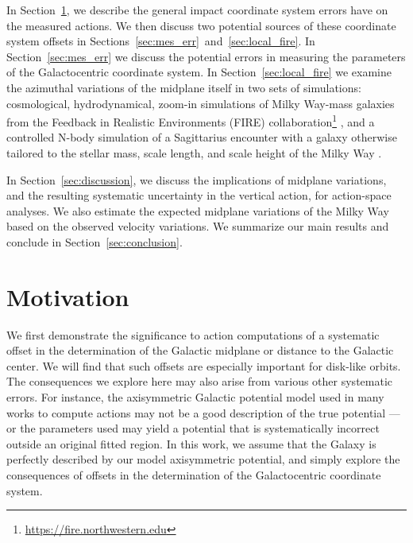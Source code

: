 \documentclass[twocolumn]{aastex62}
\begin{document}
In Section~\ref{sec:ref_frame}, we describe the general impact coordinate
system errors have on the measured actions. We then discuss two potential
sources of these coordinate system offsets in
Sections~\ref{sec:mes_err}~and~\ref{sec:local_fire}. In
Section~\ref{sec:mes_err} we discuss the potential errors in measuring the
parameters of the Galactocentric coordinate system. In
Section~\ref{sec:local_fire} we examine the azimuthal variations of the
midplane itself in two sets of simulations: cosmological, hydrodynamical,
zoom-in simulations of Milky Way-mass galaxies from the Feedback in Realistic
Environments (FIRE)
collaboration\footnote{\url{https://fire.northwestern.edu}}
\citep{2014MNRAS.445..581H, 2016ApJ...827L..23W, 2018MNRAS.480..800H}, and a
controlled N-body simulation of a Sagittarius encounter with a galaxy
otherwise tailored to the stellar mass, scale length, and scale height of the
Milky Way \citep{2018MNRAS.481..286L}.

In Section~\ref{sec:discussion}, we discuss the implications of midplane
variations, and the resulting systematic uncertainty in the vertical action,
for action-space analyses. We also estimate the expected midplane variations
of the Milky Way based on the observed velocity variations. We summarize our
main results and conclude in Section~\ref{sec:conclusion}.

\section{Motivation} \label{sec:ref_frame}
We first demonstrate the significance  to action computations of a systematic
offset in the determination of the Galactic midplane or distance to the
Galactic center. We will find that such offsets are especially important for
disk-like orbits. The consequences we explore here may also arise from various
other systematic errors. For instance, the axisymmetric Galactic potential
model used in many works to compute actions may not be a good description of
the true potential --- or the parameters used may yield a potential that is
systematically incorrect outside an original fitted region. In this work, we
assume that the Galaxy is perfectly described by our model axisymmetric
potential, and simply explore the consequences of offsets in the determination
of the Galactocentric coordinate system.
\end{document}
